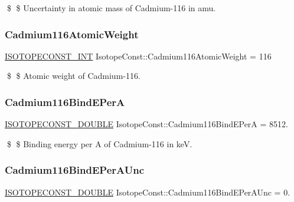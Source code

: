 \$ \$ Uncertainty in atomic mass of Cadmium-\/116 in amu. \mbox{\label{group___isotope_const-_cadmium-_cd116_gaa5201dcca150dfeb352f8985d5baba69}} 
\subsubsection{\texorpdfstring{Cadmium116\+Atomic\+Weight}{Cadmium116AtomicWeight}}
{\footnotesize\ttfamily \mbox{\hyperlink{group___isotope_const-_macros_ga5f18360b3e99483a35c32d789e62621c}{I\+S\+O\+T\+O\+P\+E\+C\+O\+N\+S\+T\+\_\+\+I\+NT}} Isotope\+Const\+::\+Cadmium116\+Atomic\+Weight = 116}

\$ \$ Atomic weight of Cadmium-\/116. \mbox{\label{group___isotope_const-_cadmium-_cd116_gaa42de61950e45b490cc7959102a871ad}} 
\subsubsection{\texorpdfstring{Cadmium116\+Bind\+E\+PerA}{Cadmium116BindEPerA}}
{\footnotesize\ttfamily \mbox{\hyperlink{group___isotope_const-_macros_ga8f45a7272ce02c0b4c65c44636ed719a}{I\+S\+O\+T\+O\+P\+E\+C\+O\+N\+S\+T\+\_\+\+D\+O\+U\+B\+LE}} Isotope\+Const\+::\+Cadmium116\+Bind\+E\+PerA = 8512.}

\$ \$ Binding energy per A of Cadmium-\/116 in keV. \mbox{\label{group___isotope_const-_cadmium-_cd116_ga66d4f940c5fb9b9e768acf0030da7253}} 
\subsubsection{\texorpdfstring{Cadmium116\+Bind\+E\+Per\+A\+Unc}{Cadmium116BindEPerAUnc}}
{\footnotesize\ttfamily \mbox{\hyperlink{group___isotope_const-_macros_ga8f45a7272ce02c0b4c65c44636ed719a}{I\+S\+O\+T\+O\+P\+E\+C\+O\+N\+S\+T\+\_\+\+D\+O\+U\+B\+LE}} Isotope\+Const\+::\+Cadmium116\+Bind\+E\+Per\+A\+Unc = 0.}

